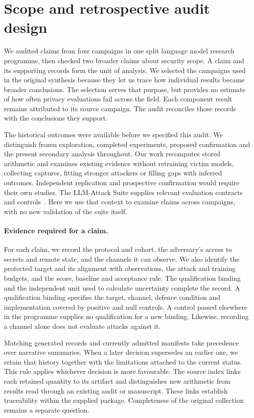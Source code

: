 \section{Scope and retrospective audit design}
\label{sec:design}

We audited claims from four campaigns in one split language model research
programme, then checked two broader claims about security scope. A claim
and its supporting records form the unit of analysis. We selected the
campaigns used in the original synthesis because they let us trace how
individual results became broader conclusions. The selection serves that
purpose, but provides no estimate of how often privacy evaluations fail
across the field. Each component result remains attributed to its source
campaign. The audit reconciles those records with the conclusions they
support.

The historical outcomes were available before we specified this audit.
We distinguish frozen exploration, completed experiments, proposed
confirmation and the present secondary analysis throughout. Our work
recomputes stored arithmetic and examines existing evidence without
retraining victim models, collecting captures, fitting stronger attackers
or filling gaps with inferred outcomes. Independent replication and
prospective confirmation would require their own studies. The
LLM-Attack Suite supplies relevant evaluation contracts and
controls~\cite{suite2026}. Here we use that context to examine claims
across campaigns, with no new validation of the suite itself.

\paragraph{Evidence required for a claim.}
For each claim, we record the protocol and cohort, the adversary's access
to secrets and remote state, and the channels it can observe. We also
identify the protected target and its alignment with observations, the
attack and training budgets, and the score, baseline and acceptance rule.
The qualification binding and the independent unit used to calculate
uncertainty complete the record. A qualification binding specifies the
target, channel, defence condition and implementation covered by positive
and null controls. A control passed elsewhere in the programme supplies
no qualification for a new binding. Likewise, recording a channel alone
does not evaluate attacks against it.

Matching generated records and currently admitted manifests take
precedence over narrative summaries. When a later decision supersedes an
earlier one, we retain that history together with the limitations attached
to the current status. This rule applies whichever decision is more
favourable. The source index links each retained quantity to its artifact
and distinguishes new arithmetic from results read through an existing
audit or manuscript. These links establish traceability within the supplied
package. Completeness of the original collection remains a separate
question.

